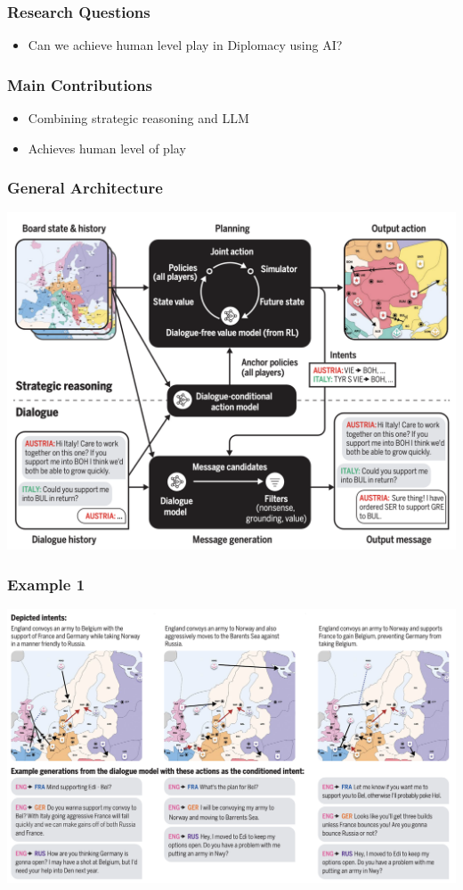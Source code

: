 \documentclass[xcolor=dvipsnames]{beamer}
\newcommand{\0}{\vec{0}}
\begin{document}
\begin{frame}
	\frametitle{Research Questions
	}
	\begin{itemize}
		\item Can we achieve human level play in Diplomacy using AI?
	\end{itemize}
\end{frame}

\begin{frame}
	\frametitle{Main Contributions
	}
	\begin{itemize}
		\item Combining strategic reasoning and LLM
		\item Achieves human level of play
	\end{itemize}
\end{frame}
\begin{frame}
	\frametitle{General Architecture}
	\begin{center}
		\includegraphics[scale=0.4]{Bakhtin1}
	\end{center}
\end{frame}
\begin{frame}
	\frametitle{Example 1}
	\begin{center}
		\includegraphics[width=\textwidth]{Bakhtin3}
	\end{center}
\end{frame}
\end{document}
